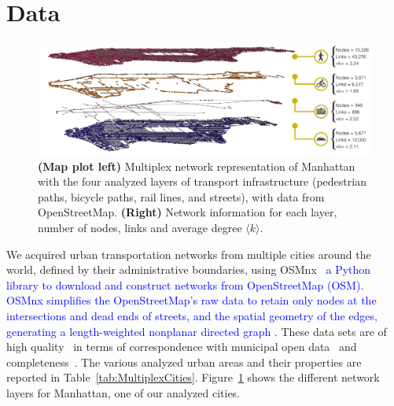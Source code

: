 \section{Data}\label{sec:overlapData}

\begin{figure}[t!]
	\centering
	\includegraphics[width=\textwidth]{images/multiplex/Multilayer_NY_op2.png}
	\caption[Manhattan multiplex network]{\textbf{(Map plot left)} Multiplex network representation of Manhattan with the four analyzed layers of transport infrastructure (pedestrian paths, bicycle paths, rail lines, and streets), with data from OpenStreetMap. \textbf{(Right)} Network information for each layer, number of nodes, links and average degree $\langle k \rangle$.}
	\label{fig:ManhattanMultiplex}
\end{figure}


We acquired urban transportation networks from multiple cities around the world, defined by their administrative boundaries, using OSMnx~\cite{boeing2017osmnx} \textcolor{blue}{a Python library to download and construct networks from OpenStreetMap (OSM). OSMnx simplifies the OpenStreetMap's raw data to retain only nodes at the intersections and dead ends of streets, and the spatial geometry of the edges, generating a length-weighted nonplanar directed graph \cite{Boeing2020Planarity}}. These data sets are of high quality~\cite{haklay2010openstreetmap,girres2010quality} in terms of correspondence with municipal open data~\cite{Ferster2019Bicycle} and completeness~\cite{barbosa2018human}. The various analyzed urban areas and their properties are reported in Table~\ref{tab:MultiplexCities}. Figure~\ref{fig:ManhattanMultiplex} shows the different network layers for Manhattan, one  of our analyzed cities.

